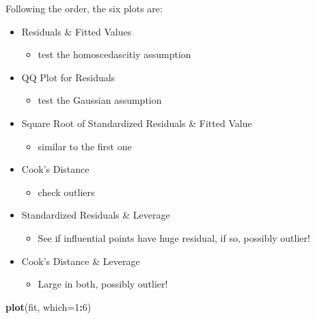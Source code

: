 \documentclass[
]{ctexart}
\newenvironment{Shaded}{\begin{snugshade}}{\end{snugshade}}
\newcommand{\AttributeTok}[1]{\textcolor[rgb]{0.13,0.29,0.53}{#1}}
\newcommand{\DecValTok}[1]{\textcolor[rgb]{0.00,0.00,0.81}{#1}}
\newcommand{\FunctionTok}[1]{\textcolor[rgb]{0.13,0.29,0.53}{\textbf{#1}}}
\newcommand{\NormalTok}[1]{#1}
\newcommand{\SpecialCharTok}[1]{\textcolor[rgb]{0.81,0.36,0.00}{\textbf{#1}}}
\providecommand{\tightlist}{%
  \setlength{\itemsep}{0pt}\setlength{\parskip}{0pt}}
\begin{document}
Following the order, the six plots are:

\begin{itemize}
\tightlist
\item
  Residuals \& Fitted Values

  \begin{itemize}
  \tightlist
  \item
    test the homoscedascitiy assumption
  \end{itemize}
\item
  QQ Plot for Residuals

  \begin{itemize}
  \tightlist
  \item
    test the Gaussian assumption
  \end{itemize}
\item
  Square Root of Standardized Residuals \& Fitted Value

  \begin{itemize}
  \tightlist
  \item
    similar to the first one
  \end{itemize}
\item
  Cook's Distance

  \begin{itemize}
  \tightlist
  \item
    check outliers
  \end{itemize}
\item
  Standardized Residuals \& Leverage

  \begin{itemize}
  \tightlist
  \item
    See if influential points have huge residual, if so, possibly
    outlier!
  \end{itemize}
\item
  Cook's Distance \& Leverage

  \begin{itemize}
  \tightlist
  \item
    Large in both, possibly outlier!
  \end{itemize}
\end{itemize}

\begin{Shaded}
\begin{Highlighting}[]
\FunctionTok{plot}\NormalTok{(fit, }\AttributeTok{which=}\DecValTok{1}\SpecialCharTok{:}\DecValTok{6}\NormalTok{)}
\end{Highlighting}
\end{Shaded}
\end{document}

